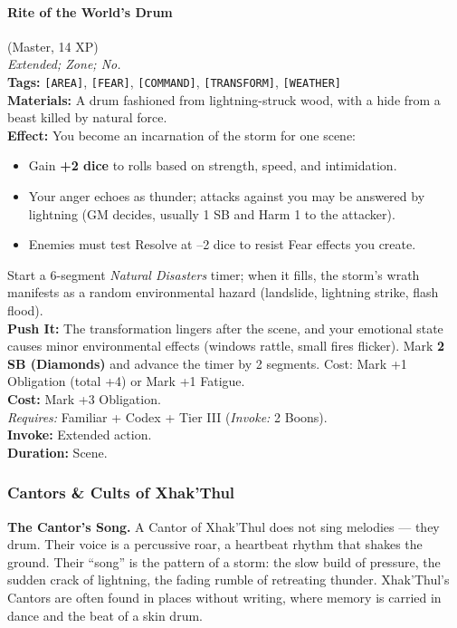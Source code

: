 \paragraph{Rite of the World's Drum} (Master, 14 XP) \hfill \\
\emph{Extended; Zone; No.} \\
\textbf{Tags:} \texttt{[AREA]}, \texttt{[FEAR]}, \texttt{[COMMAND]}, \texttt{[TRANSFORM]}, \texttt{[WEATHER]} \\
\textbf{Materials:} A drum fashioned from lightning-struck wood, with a hide from a beast killed by natural force. \\
\textbf{Effect:} You become an incarnation of the storm for one scene:
\begin{itemize}
  \item Gain \textbf{+2 dice} to rolls based on strength, speed, and intimidation.
  \item Your anger echoes as thunder; attacks against you may be answered by lightning (GM decides, usually 1 SB and Harm 1 to the attacker).
  \item Enemies must test Resolve at --2 dice to resist Fear effects you create.
\end{itemize}
Start a 6-segment \textit{Natural Disasters} timer; when it fills, the storm's wrath manifests as a random environmental hazard (landslide, lightning strike, flash flood). \\
\textbf{Push It:} The transformation lingers after the scene, and your emotional state causes minor environmental effects (windows rattle, small fires flicker). Mark \textbf{2 SB (Diamonds)} and advance the timer by 2 segments. Cost: Mark +1 Obligation (total +4) or Mark +1 Fatigue. \\
\textbf{Cost:} Mark +3 Obligation. \\
\textit{Requires:} Familiar + Codex + Tier III (\textit{Invoke:} 2 Boons). \\
\textbf{Invoke:} Extended action. \\
\textbf{Duration:} Scene.

\subsubsection*{Cantors \& Cults of Xhak'Thul}

\textbf{The Cantor's Song.} A Cantor of Xhak'Thul does not sing melodies --- they drum. Their voice is a percussive roar, a heartbeat rhythm that shakes the ground. Their ``song'' is the pattern of a storm: the slow build of pressure, the sudden crack of lightning, the fading rumble of retreating thunder. Xhak'Thul's Cantors are often found in places without writing, where memory is carried in dance and the beat of a skin drum.

